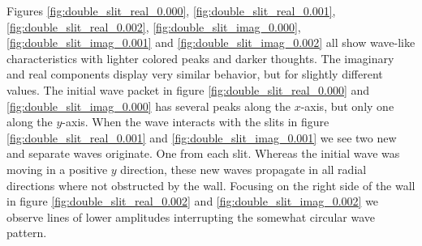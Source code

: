 \documentclass[english,notitlepage,reprint,nofootinbib]{revtex4-1}  %
\begin{document}
Figures \ref{fig:double_slit_real_0.000}, \ref{fig:double_slit_real_0.001}, \ref{fig:double_slit_real_0.002}, \ref{fig:double_slit_imag_0.000}, \ref{fig:double_slit_imag_0.001} and \ref{fig:double_slit_imag_0.002} all show wave-like characteristics with lighter colored peaks and darker thoughts. The imaginary and real components display very similar behavior, but for slightly different values. The initial wave packet in figure \ref{fig:double_slit_real_0.000} and \ref{fig:double_slit_imag_0.000} has several peaks along the $x$-axis, but only one along the $y$-axis. When the wave interacts with the slits in figure \ref{fig:double_slit_real_0.001} and \ref{fig:double_slit_imag_0.001} we see two new and separate waves originate. One from each slit. Whereas the initial wave was moving in a positive $y$ direction, these new waves propagate in all radial directions where not obstructed by the wall. Focusing on the right side of the wall in figure \ref{fig:double_slit_real_0.002} and \ref{fig:double_slit_imag_0.002} we observe lines of lower amplitudes interrupting the somewhat circular wave pattern.
\end{document}
